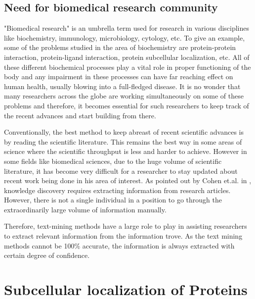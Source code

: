 \subsection*{Need for biomedical research community}

"Biomedical research" is an umbrella term used for research in various disciplines like biochemistry, immunology, microbiology, cytology, etc. To give an example, some of the problems studied in the area of biochemistry are protein-protein interaction, protein-ligand interaction, protein subcellular localization, etc. All of these different biochemical processes play a vital role in proper functioning of the body and any impairment in these processes can have far reaching effect on human health, usually blowing into a full-fledged disease. It is no wonder that many researchers across the globe are working simultaneously on some of these problems and therefore, it becomes essential for such researchers to keep track of the recent advances and start building from there. 

Conventionally, the best method to keep abreast of recent scientific advances is by reading the scientific literature. This remains the best way in some areas of science where the scientific throughput is less and harder to achieve. However in some fields like biomedical sciences, due to the huge volume of scientific literature, it has become very difficult for a researcher to stay updated about recent work being done in his area of interest. As pointed out by Cohen et.al. in \cite{cohen2005survey}, knowledge discovery requires extracting information from research articles. However, there is not a single individual in a position to go through the extraordinarily large volume of information manually.

Therefore, text-mining methods have a large role to play in assisting researchers to extract relevant information from the information trove. As the text mining methods cannot be 100\% accurate, the information is always extracted with certain degree of confidence.

\section{Subcellular localization of Proteins}

